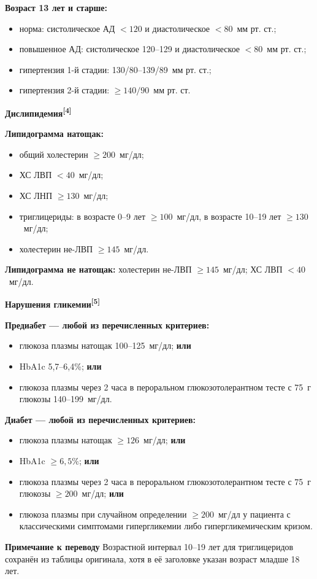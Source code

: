 \documentclass[11pt,a4paper]{article}
\newcommand{\src}[1]{\textsuperscript{[#1]}}
\newcommand{\editorial}[1]{\par\begingroup\small\color{black!70}\textbf{Примечание к переводу} #1\par\endgroup}
\newcommand{\heading}[1]{\par\medskip\textbf{#1}\par}
\begin{document}
\textbf{Возраст 13 лет и старше:}
\begin{itemize}
\item норма: систолическое АД $<120$ и диастолическое $<80$~мм рт. ст.;
\item повышенное АД: систолическое 120--129 и диастолическое $<80$~мм рт. ст.;
\item гипертензия 1-й стадии: 130/80--139/89~мм рт. ст.;
\item гипертензия 2-й стадии: $\geq140/90$~мм рт. ст.
\end{itemize}

\heading{Дислипидемия\src{4}}
\textbf{Липидограмма натощак:}
\begin{itemize}
\item общий холестерин $\geq200$~мг/дл;
\item ХС ЛВП $<40$~мг/дл;
\item ХС ЛНП $\geq130$~мг/дл;
\item триглицериды: в возрасте 0--9 лет $\geq100$~мг/дл, в возрасте 10--19 лет $\geq130$~мг/дл;
\item холестерин не-ЛВП $\geq145$~мг/дл.
\end{itemize}
\textbf{Липидограмма не натощак:} холестерин не-ЛВП $\geq145$~мг/дл; ХС ЛВП $<40$~мг/дл.

\heading{Нарушения гликемии\src{5}}
\textbf{Предиабет --- любой из перечисленных критериев:}
\begin{itemize}
\item глюкоза плазмы натощак 100--125~мг/дл; \textbf{или}
\item HbA1c 5,7--6,4\%; \textbf{или}
\item глюкоза плазмы через 2 часа в пероральном глюкозотолерантном тесте с 75~г глюкозы 140--199~мг/дл.
\end{itemize}
\textbf{Диабет --- любой из перечисленных критериев:}
\begin{itemize}
\item глюкоза плазмы натощак $\geq126$~мг/дл; \textbf{или}
\item HbA1c $\geq6{,}5\%$; \textbf{или}
\item глюкоза плазмы через 2 часа в пероральном глюкозотолерантном тесте с 75~г глюкозы $\geq200$~мг/дл; \textbf{или}
\item глюкоза плазмы при случайном определении $\geq200$~мг/дл у пациента с классическими симптомами гипергликемии либо гипергликемическим кризом.
\end{itemize}
\editorial{Возрастной интервал 10--19 лет для триглицеридов сохранён из таблицы оригинала, хотя в её заголовке указан возраст младше 18 лет.}
\end{document}
